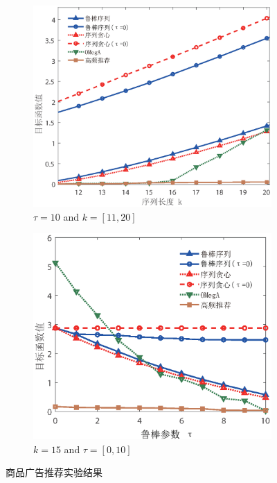 \begin{figure}[H]
    \medskip

    \begin{subfigure}{0.45\textwidth}
       \includegraphics[width=\linewidth]{figure/rosenets/rec/rec-fun1}
        \caption{$\tau=10$ and $k=[11,20]$}
        \label{fig:rec-fun}
    \end{subfigure}
    \hfill
    \begin{subfigure}{0.45\textwidth}
        \includegraphics[width=\linewidth]{figure/rosenets/rec/rec-fun1-t}
        \caption{$k=15$ and $\tau=[0,10]$}
        \label{fig:rec-fun-t}
    \end{subfigure}
    \caption{商品广告推荐实验结果\label{fig:rec}}
\end{figure}


